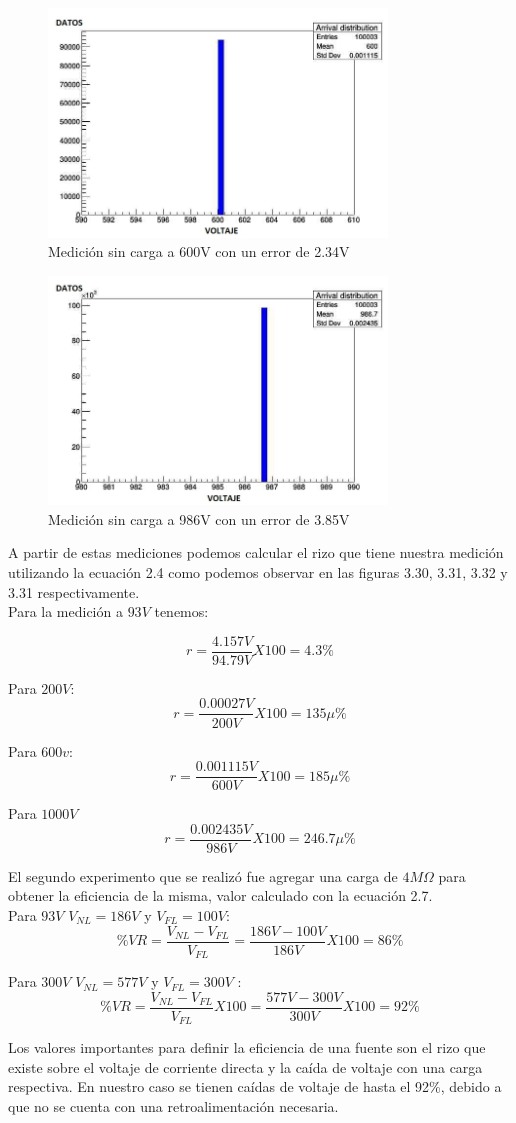 \begin{figure}[H]
\centering
\includegraphics[width=9cm]{Capitulo3/figs/600v.jpg}
\caption{Medición sin carga a 600V con un error de 2.34V}
\end{figure}

\begin{figure}[H]
\centering
\includegraphics[width=9cm]{Capitulo3/figs/986V.jpg}
\caption{Medición sin carga a 986V con un error de 3.85V}
\end{figure}

A partir de estas mediciones podemos calcular el rizo que tiene nuestra medición utilizando la ecuación 2.4 como podemos observar en las figuras 3.30, 3.31, 3.32 y 3.31  respectivamente. \\

Para la medición a $93V$ tenemos:

 $$r=\frac{4.157V}{94.79V}X100=4.3 \% $$ 
 
 Para $200V$: $$r=\frac{0.00027V}{200V}X100=135\mu \% $$ 
 
 Para $600v:$  $$r=\frac{0.001115V}{600V}X100=185\mu \% $$ 
 
 Para $1000V$  $$r=\frac{0.002435V}{986V}X100=246.7\mu \% $$

El segundo experimento que se realizó fue agregar una carga de $4M\Omega$ para obtener la eficiencia de la misma, valor calculado con la ecuación 2.7. \\

Para $93V$ $V_{NL}=186V$ y $V_{FL}=100V$: $$\%VR=\frac{V_{NL}-V_{FL}}{V_{FL}}=\frac{186V-100V}{186V}X100= 86 \% $$

Para $300V$ $V_{NL}=577V$ y $V_{FL}=300V$ : $$\%VR=\frac{V_{NL}-V_{FL}}{V_{FL}}X100=\frac{577V-300V}{300V}X100= 92\% $$

Los valores importantes para definir la eficiencia de una fuente son el rizo que existe sobre el voltaje de corriente directa y la caída de voltaje con una carga respectiva. En nuestro caso se tienen caídas de voltaje de hasta el 92\%, debido a que no se cuenta con una retroalimentación necesaria.

